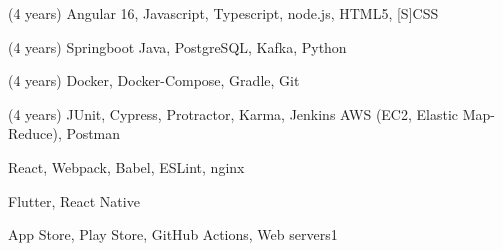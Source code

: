 
\begin{cvskills}


  {(4 years) Angular 16, Javascript, Typescript, node.js, HTML5, [S]CSS}

  {(4 years) Springboot Java, PostgreSQL, Kafka, Python}

  {(4 years) Docker, Docker-Compose, Gradle, Git}

  {(4 years) JUnit, Cypress, Protractor, Karma, Jenkins}
  \vspace{0.5em}
  {AWS (EC2, Elastic Map-Reduce), Postman}

  {React, Webpack, Babel, ESLint, nginx}

  {Flutter, React Native}

  {App Store, Play Store, GitHub Actions, Web servers1}

\end{cvskills}
